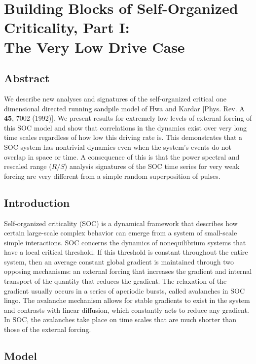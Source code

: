 \chapter{Building Blocks of Self-Organized Criticality, Part I: \\
The Very Low Drive Case}
\label{sec:partI}

\bigskip

\section*{Abstract}
\label{sec:partI_abstract}
We describe new analyses and signatures of the self-organized critical
one dimensional directed running sandpile model of Hwa and Kardar
[Phys. Rev. A {\bf 45}, 7002 (1992)].  We present results for
extremely low levels of external forcing of this SOC model and show
that correlations in the dynamics exist over very long time scales
regardless of how low this driving rate is.  This demonstrates that a
SOC system has nontrivial dynamics even when the system's events do
not overlap in space or time.  A consequence of this is that the power
spectral and rescaled range ($R/S$) analysis signatures of the SOC
time series for very weak forcing are very different from a simple
random superposition of pulses.

\section{Introduction}
\label{sec:partI_introduction}

Self-organized criticality (SOC) \citet{btw87a,btw88a} is a dynamical
framework that describes how certain large-scale complex behavior can
emerge from a system of small-scale simple interactions.  SOC concerns
the dynamics of nonequilibrium systems that have a local critical
threshold.  If this threshold is constant throughout the entire
system, then an average constant global gradient is maintained through
two opposing mechanisms: an external forcing that increases the
gradient and internal transport of the quantity that reduces the
gradient.  The relaxation of the gradient usually occurs in a series
of aperiodic bursts, called avalanches in SOC lingo.  The avalanche
mechanism allows for stable gradients to exist in the system and
contrasts with linear diffusion, which constantly acts to reduce any
gradient.  In SOC, the avalanches take place on time scales that are
much shorter than those of the external forcing.

\section{Model}
\label{sec:partI_one-dimens-runn}

